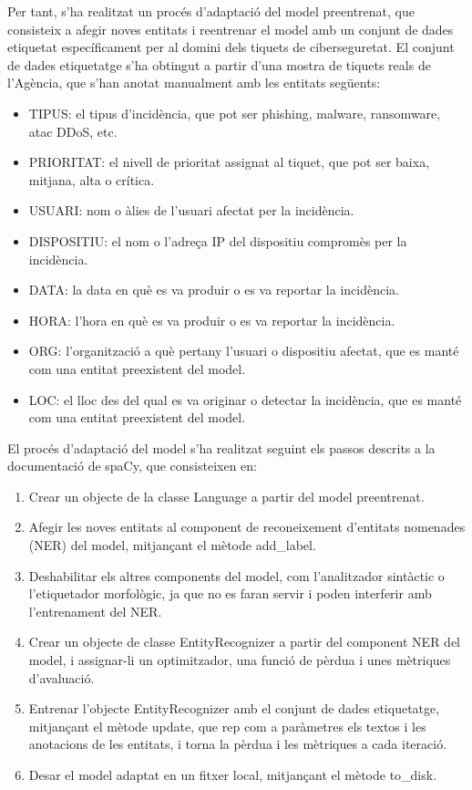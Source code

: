 Per tant, s'ha realitzat un procés d'adaptació del model preentrenat, que consisteix a afegir noves entitats i reentrenar el model amb un conjunt de dades etiquetat específicament per al domini dels tiquets de ciberseguretat. El conjunt de dades etiquetatge s'ha obtingut a partir d'una mostra de tiquets reals de l'Agència, que s'han anotat manualment amb les entitats següents:

\begin{itemize}
     \item TIPUS: el tipus d'incidència, que pot ser phishing, malware, ransomware, atac DDoS, etc.
     \item PRIORITAT: el nivell de prioritat assignat al tiquet, que pot ser baixa, mitjana, alta o crítica.
     \item USUARI: nom o àlies de l'usuari afectat per la incidència.
     \item DISPOSITIU: el nom o l'adreça IP del dispositiu compromès per la incidència.
     \item DATA: la data en què es va produir o es va reportar la incidència.
     \item HORA: l'hora en què es va produir o es va reportar la incidència.
     \item ORG: l'organització a què pertany l'usuari o dispositiu afectat, que es manté com una entitat preexistent del model.
     \item LOC: el lloc des del qual es va originar o detectar la incidència, que es manté com una entitat preexistent del model.
\end{itemize}

El procés d'adaptació del model s'ha realitzat seguint els passos descrits a la documentació de spaCy, que consisteixen en:

\begin{enumerate}
     \item Crear un objecte de la classe Language a partir del model preentrenat.
     \item Afegir les noves entitats al component de reconeixement d'entitats nomenades (NER) del model, mitjançant el mètode add\_label.
     \item Deshabilitar els altres components del model, com l'analitzador sintàctic o l'etiquetador morfològic, ja que no es faran servir i poden interferir amb l'entrenament del NER.
     \item Crear un objecte de classe EntityRecognizer a partir del component NER del model, i assignar-li un optimitzador, una funció de pèrdua i unes mètriques d'avaluació.
     \item Entrenar l'objecte EntityRecognizer amb el conjunt de dades etiquetatge, mitjançant el mètode update, que rep com a paràmetres els textos i les anotacions de les entitats, i torna la pèrdua i les mètriques a cada iteració.
     \item Desar el model adaptat en un fitxer local, mitjançant el mètode to\_disk.
\end{enumerate}


